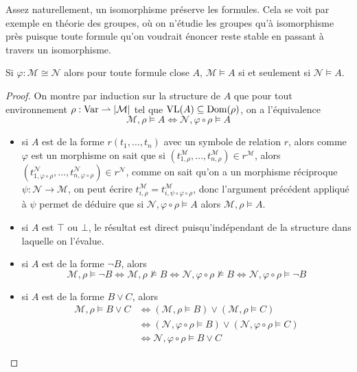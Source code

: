 Assez naturellement, un isomorphisme préserve les formules. Cela se voit par
exemple en théorie des groupes, où on n'étudie les groupes qu'à isomorphisme
près puisque toute formule qu'on voudrait énoncer reste stable en passant à
travers un isomorphisme.

\begin{proposition}
  Si $\varphi : \mathcal M \cong \mathcal N$ alors pour toute formule close $A$,
  $\mathcal M\models A$ si et seulement si $\mathcal N\models A$.
\end{proposition}

\begin{proof}
  On montre par induction sur la structure de $A$ que pour tout environnement
  $\rho : \operatorname{Var}\rightharpoonup |\mathcal M|$ tel que $\operatorname{VL}(A) \subseteq\operatorname{Dom}(\rho)$,
  on a l'équivalence
  \[\mathcal M,\rho\models A \iff \mathcal N,\varphi\circ \rho\models A\]
  \begin{itemize}
  \item si $A$ est de la forme $r(t_1,\ldots,t_n)$ avec un symbole de relation
    $r$, alors comme $\varphi$ est un morphisme on sait que si
    $(t_{1,\rho}^\mathcal M,\ldots,t_{n,\rho}^\mathcal M)\in r^\mathcal M$, alors
    $(t_{1,\varphi\circ \rho}^\mathcal N,\ldots,
    t_{n,\varphi\circ\rho}^\mathcal N)\in r^{\mathcal N}$, comme on sait qu'on a
    un morphisme réciproque $\psi : \mathcal N \to \mathcal M$, on peut
    écrire $t_{i,\rho}^\mathcal M = t_{i,\psi\circ\varphi\circ\rho}^\mathcal M$, donc
    l'argument précédent appliqué à $\psi$ permet de déduire que si
    $\mathcal N,\varphi\circ \rho\models A$ alors $\mathcal M,\rho\models A$.
  \item si $A$ est $\top$ ou $\bot$, le résultat est direct puisqu'indépendant
    de la structure dans laquelle on l'évalue.
  \item si $A$ est de la forme $\lnot B$, alors
    \[\mathcal M, \rho\models \lnot B\iff \mathcal M, \rho\not\models B
    \iff \mathcal N,\varphi\circ\rho\not\models B
    \iff \mathcal N,\varphi\circ\rho\models \lnot B\]
  \item si $A$ est de la forme $B\lor C$, alors
    \begin{align*}
      \mathcal M, \rho \models B\lor C &\iff (\mathcal M,\rho\models B)\lor
      (\mathcal M,\rho\models C) \\
      &\iff (\mathcal N,\varphi\circ\rho\models B)\lor
      (\mathcal N,\varphi\circ\rho\models C)\\
      &\iff \mathcal N,\varphi\circ \rho \models B\lor C
      \end{align*}

\end{itemize}
\end{proof}
